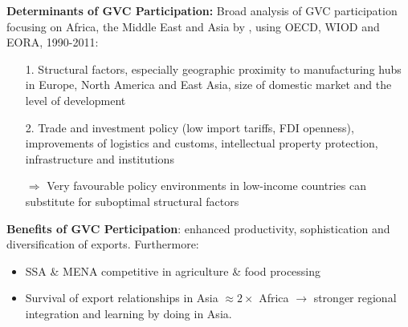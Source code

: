 \documentclass[compress]{beamer}
\begin{document}
\begin{frame}
\textbf{Determinants of GVC Participation:} Broad analysis of GVC participation focusing on Africa, the Middle East and Asia by \citet{kowalski2015participation}, using OECD, WIOD and EORA, 1990-2011:  \\ \vspace{1mm}

\begin{itemize} \setlength{\itemsep}{0.5em}
\item[1.] Structural factors, especially geographic proximity to manufacturing hubs in Europe, North America and East Asia, size of domestic market and the level of development
\item[2.] Trade and investment policy (low import tariffs, FDI openness), improvements of logistics and customs, intellectual property protection, infrastructure and institutions
\item[$\Rightarrow$] Very favourable policy environments in low-income countries can substitute for suboptimal structural factors
\end{itemize} \vspace{2mm}
\textbf{Benefits of GVC Perticipation}: enhanced productivity, sophistication and diversification of exports. Furthermore:
\begin{itemize} \setlength{\itemsep}{0.5em}
\item SSA \& MENA competitive in agriculture \& food processing
\item Survival of export relationships in Asia $\approx 2\times$ Africa $\to$ stronger regional integration and learning by doing in Asia. 
\end{itemize}
\end{frame}
\end{document}
